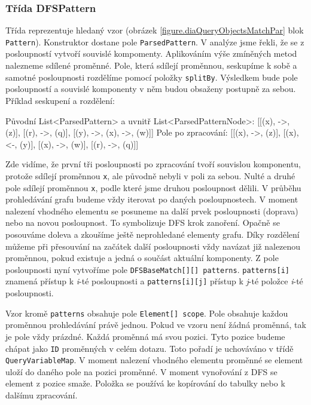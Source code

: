 \subsubsection{Třída DFSPattern}

Třída reprezentuje hledaný vzor (obrázek \ref{figure.diaQueryObjectsMatchPar} blok \texttt{Pattern}).
Konstruktor dostane pole \texttt{ParsedPattern}.
V analýze jsme řekli, že se z posloupností vytvoří souvislé kompomenty.
Aplikováním výše zmíněných metod nalezneme sdílené proměnné.
Pole, která sdílejí proměnnou, seskupíme k sobě a samotné posloupnosti rozdělíme pomocí položky \texttt{splitBy}.
Výsledkem bude pole posloupností a souvislé komponenty v něm budou obsaženy postupně za sebou.
Příklad seskupení a rozdělení:
\begin{code}
Původní List<ParsedPattern> a uvnitř List<ParsedPatternNode>:
[[(x), ->, (z)], [(r), ->, (q)], [(y), ->, (x), ->, (w)]]
Pole po zpracování:
[[(x), ->, (z)], [(x), <-, (y)], [(x), ->, (w)], [(r), ->, (q)]]
\end{code}
Zde vidíme, že první tři posloupnosti po zpracování tvoří souvislou komponentu, protože sdílejí proměnnou \texttt{x}, ale původně nebyli v poli za sebou.
Nulté a druhé pole sdílejí proměnnou \texttt{x}, podle které jsme druhou posloupnost dělili.
V průběhu prohledávání grafu budeme vždy iterovat po daných posloupnostech.
V moment nalezení vhodného elementu se posuneme na další prvek posloupnosti (doprava) nebo na novou posloupnost.
To symbolizuje DFS krok zanoření.
Opačně se posouváme doleva a zkoušíme ještě neprohledané elementy grafu.
Díky rozdělení můžeme při přesouvání na začátek další posloupnosti vždy navázat již nalezenou proměnnou, pokud existuje a jedná o součást aktuální komponenty.
Z pole posloupnosti nyní vytvoříme pole \texttt{DFSBaseMatch[][] patterns}.
\texttt{patterns[i]} znamená přístup k \textit{i}-té posloupnosti a \texttt{patterns[i][j]} přístup k \textit{j}-té položce  \textit{i}-té posloupnosti. 

Vzor kromě \texttt{patterns} obsahuje pole \texttt{Element[] scope}.
Pole obsahuje každou proměnnou prohledávání právě jednou. 
Pokud ve vzoru není žádná proměnná, tak je pole vždy prázdné.
Každá proměnná má svou pozici.
Tyto pozice budeme chápat jako \texttt{ID} proměnných v celém dotazu.
Toto pořadí je uchováváno v třídě \texttt{QueryVariableMap}.
V moment nalezení vhodného elementu proměnné se element uloží do daného pole na pozici proměnné.
V moment vynořování z DFS se element z pozice smaže.
Položka se používá ke kopírování do tabulky nebo k dalšímu zpracování.

